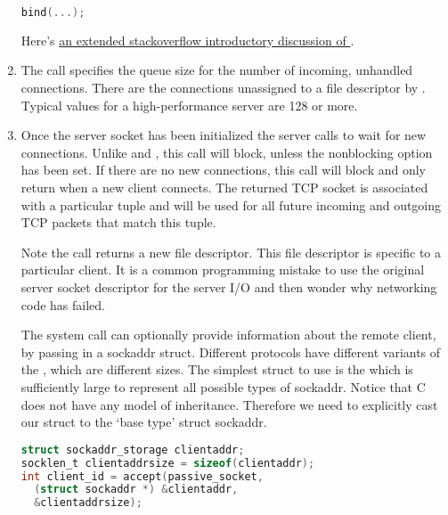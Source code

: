 \begin{enumerate}
\begin{lstlisting}[language=C]
bind(...);
  \end{lstlisting}

  Here's \href{http://stackoverflow.com/questions/14388706/socket-options-so-reuseaddr-and-so-reuseport-how-do-they-differ-do-they-mean-t}{an extended stackoverflow introductory discussion of }.

  \item {}

    The  call specifies the queue size for the number of incoming, unhandled connections.
    There are the connections unassigned to a file descriptor by .
    Typical values for a high-performance server are 128 or more.

  \item {}

  Once the server socket has been initialized the server calls  to wait for new connections.
  Unlike   and , this call will block, unless the nonblocking option has been set.
  If there are no new connections, this call will block and only return when a new client connects.
  The returned TCP socket is associated with a particular tuple  and will be used for all future incoming and outgoing TCP packets that match this tuple.

  Note the  call returns a new file descriptor.
  This file descriptor is specific to a particular client.
  It is a common programming mistake to use the original server socket descriptor for the server I/O and then wonder why networking code has failed.

  The  system call can optionally provide information about the remote client, by passing in a sockaddr struct.
  Different protocols have different variants of the , which are different sizes.
  The simplest struct to use is the  which is sufficiently large to represent all possible types of sockaddr.
  Notice that C does not have any model of inheritance.
  Therefore we need to explicitly cast our struct to the `base type' struct sockaddr.

  \begin{lstlisting}[language=C]
struct sockaddr_storage clientaddr;
socklen_t clientaddrsize = sizeof(clientaddr);
int client_id = accept(passive_socket,
  (struct sockaddr *) &clientaddr,
  &clientaddrsize);
  \end{lstlisting}


\end{enumerate}
